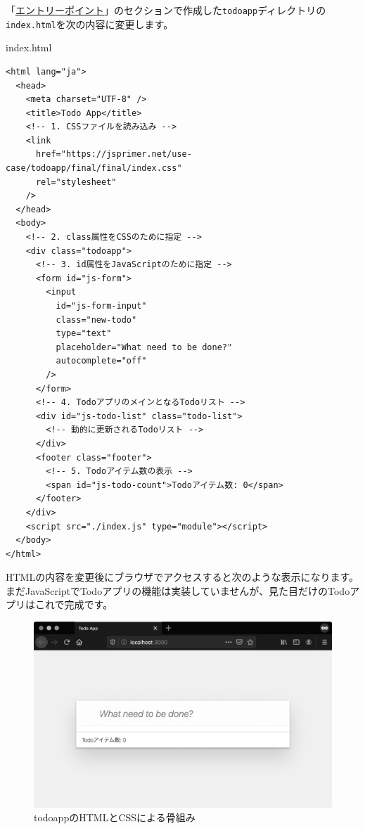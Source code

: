 「\hyperlink{entrypoint_todo}{エントリーポイント}」のセクションで作成した\texttt{todoapp}ディレクトリの\texttt{index.html}を次の内容に変更します。

\begin{listtitle}
index.html
\end{listtitle}
\begin{lstlisting}
<html lang="ja">
  <head>
    <meta charset="UTF-8" />
    <title>Todo App</title>
    <!-- 1. CSSファイルを読み込み -->
    <link
      href="https://jsprimer.net/use-case/todoapp/final/final/index.css"
      rel="stylesheet"
    />
  </head>
  <body>
    <!-- 2. class属性をCSSのために指定 -->
    <div class="todoapp">
      <!-- 3. id属性をJavaScriptのために指定 -->
      <form id="js-form">
        <input
          id="js-form-input"
          class="new-todo"
          type="text"
          placeholder="What need to be done?"
          autocomplete="off"
        />
      </form>
      <!-- 4. TodoアプリのメインとなるTodoリスト -->
      <div id="js-todo-list" class="todo-list">
        <!-- 動的に更新されるTodoリスト -->
      </div>
      <footer class="footer">
        <!-- 5. Todoアイテム数の表示 -->
        <span id="js-todo-count">Todoアイテム数: 0</span>
      </footer>
    </div>
    <script src="./index.js" type="module"></script>
  </body>
</html>
\end{lstlisting}
\listend

HTMLの内容を変更後にブラウザでアクセスすると次のような表示になります。
まだJavaScriptでTodoアプリの機能は実装していませんが、見た目だけのTodoアプリはこれで完成です。

\begin{figure}[h]
\centering
\includegraphics[width=120mm]{./fig/todo-html.eps}
\caption{todoappのHTMLとCSSによる骨組み}
\end{figure}


